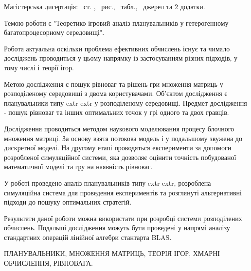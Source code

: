 
Магістерська дисертація: \pageref*{MyLastPage}~ст. , \totfig~рис.,  \tottab~табл., ~джерел та 2 додатки.

Темою роботи є "Теоретико-ігровий аналіз планувальників у гетерогенному багатопроцесорному середовищі".

Робота актуальна оскільки проблема ефективних обчислень існує та чимало досліджень проводиться у цьому напрямку із застосуванням різних підходів, у тому числі і теорії ігор.

Метою дослідження є пошук рівноваг та рішень гри множення матриць у розподіленому середовищі з двома користувачами. Об'єктом дослідження є планувальники типу extr-extr у розподіленому середовищі. Предмет дослідження - пошук рівноваг та інших оптимальних точок у грі одного та двох гравців.

Дослідження проводиться методом наукового моделювання процесу блочного множення матриці. За основу взята потокова модель і у подальшому звужена до дискретної моделі. На другому етапі проводяться експерименти за допомоги розробленої симуляційної системи, яка дозволяє оцінити точність побудованої математичної моделі та гру на наявність рівноваг.

У роботі проведено аналіз планувальників типу extr-extr, розроблена симуляційна система для проведення експериментів та розглянуті альтернативні підходи до пошуку оптимальних стратегій.

Результати даної роботи можна використати при розробці системи розподілених обчислень. Подальші дослідження можуть бути проведені у напрямі аналізу стандартних операцій лінійної алгебри стантарта BLAS.

\MakeUppercase{планувальники, множення матриць, теорія ігор, хмарні обчислення, рівновага.}